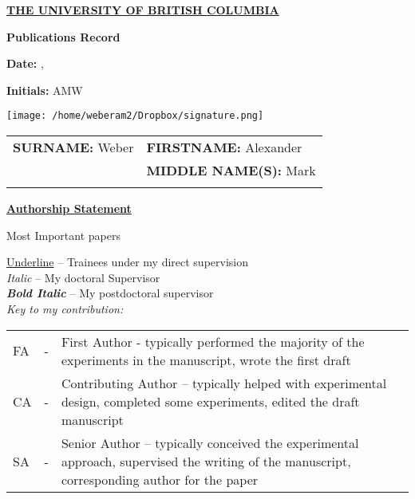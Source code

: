 \documentclass[11pt,notitlepage,english]{report}
\makeatletter
\newcommand{\monthyeardate}{%
  \DTMenglishmonthname{\@dtm@month}, \@dtm@year
}
\makeatother
\begin{document}
\pagebreak

\begin{center}
  \underline{\textbf{THE UNIVERSITY OF BRITISH COLUMBIA}}
  \vspace{10pt}

  \textbf{Publications Record}
\end{center}

\noindent %
\begin{minipage}[t]{0.33\textwidth}
  \raggedright
  \textbf{Date:} \monthyeardate
\end{minipage}%
\begin{minipage}[t]{0.33\textwidth}
  \begin{center}
    \textbf{Initials:} AMW \hspace{10pt} 
  \end{center}
\end{minipage}%
\begin{minipage}[t]{0.33\textwidth}
  \raggedleft
  \texttt{[image: /home/weberam2/Dropbox/signature.png]}
\end{minipage}


\vspace{15pt}


\begin{tabular}{L{8cm} L{6.9cm}}
  \textbf{SURNAME:} Weber                       & \textbf{FIRSTNAME:} Alexander      \\
                                                & \textbf{MIDDLE NAME(S):} Mark      \\
                                                \\
\end{tabular}

\noindent\textbf{\underline{Authorship Statement}}

\vspace{5pt}
\noindent* Most Important papers 
\vspace{5pt}

\noindent\underline{Underline} – Trainees under my direct supervision \\
\textit{Italic} – My doctoral Supervisor\\
\textit{\textbf{Bold Italic}} – My postdoctoral supervisor\\

\noindent\textit{Key to my contribution:} \\
\begin{longtable}{ L{.4cm} L{.2cm}  L{15.2cm}  }
  FA & - & First Author - typically performed the majority of the experiments in the manuscript, wrote the first draft \\
  CA & - & Contributing Author – typically helped with experimental design, completed some experiments, edited the draft manuscript \\
  SA & - & Senior Author – typically conceived the experimental approach, supervised the writing of the manuscript, corresponding author for the paper\\
\end{longtable}
\end{document}
